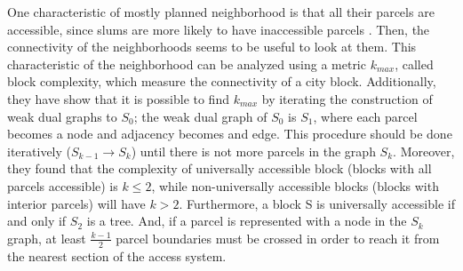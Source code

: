 \documentclass[10pt]{article}
\begin{document}
One characteristic of mostly planned neighborhood is that all their parcels are accessible, since slums are more likely to have inaccessible parcels \cite{unh}. Then, the connectivity of the neighborhoods seems to be useful to look at them. This characteristic of the neighborhood can be analyzed using a metric $k_{max}$, called block complexity, which measure the connectivity of a city block. Additionally, they have show that it is possible to find $k_{max}$ by iterating the construction of weak dual graphs to $S_0$; the weak dual graph of $S_0$ is $S_1$, where each parcel becomes a node and adjacency becomes and edge. This procedure should be done iteratively ($S_{k-1}\longrightarrow S_k$) until there is not more parcels in the graph $S_k$. Moreover, they found that the complexity of universally accessible block (blocks with all parcels accessible) is $k \leq 2$, while non-universally accessible blocks (blocks with interior parcels) will have $k>2$. Furthermore, a block S is universally accessible if and only if $S_2$ is a tree. And, if a parcel is represented with a node in the $S_k$ graph, at least $\frac{k-1}{2}$ parcel boundaries must be crossed in order to reach it from the nearest section of the access system.\\
\end{document}
